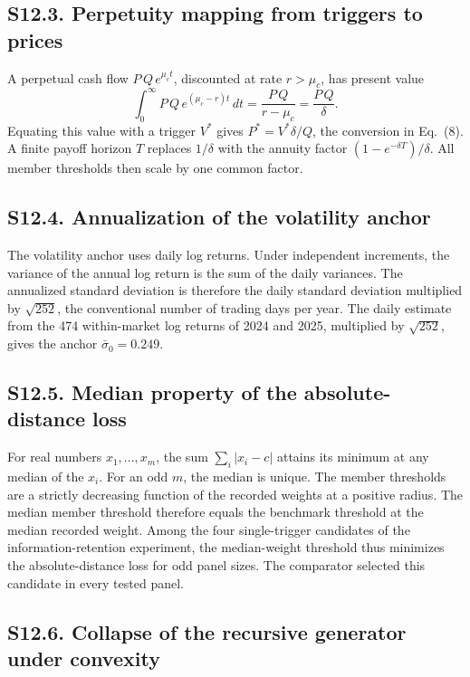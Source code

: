 \documentclass[11pt]{article}
\newcommand{\sbar}{\bar{\sigma}_0}
\begin{document}
\subsection*{S12.3. Perpetuity mapping from triggers to prices}

A perpetual cash flow $P\,Q\,e^{\mu_c t}$, discounted at rate $r>\mu_c$, has present value
\begin{equation*}
\int_{0}^{\infty}P\,Q\,e^{(\mu_c-r)t}\,dt=\frac{P\,Q}{r-\mu_c}=\frac{P\,Q}{\delta}.
\end{equation*}
Equating this value with a trigger $V^{*}$ gives $P^{*}=V^{*}\delta/Q$, the conversion in Eq.~(8). A finite payoff horizon $T$ replaces $1/\delta$ with the annuity factor $(1-e^{-\delta T})/\delta$. All member thresholds then scale by one common factor.

\subsection*{S12.4. Annualization of the volatility anchor}

The volatility anchor uses daily log returns. Under independent increments, the variance of the annual log return is the sum of the daily variances. The annualized standard deviation is therefore the daily standard deviation multiplied by $\sqrt{252}$, the conventional number of trading days per year. The daily estimate from the 474 within-market log returns of 2024 and 2025, multiplied by $\sqrt{252}$, gives the anchor $\sbar=0.249$.

\subsection*{S12.5. Median property of the absolute-distance loss}

For real numbers $x_1,\dots,x_m$, the sum $\sum_{i}\lvert x_i-c\rvert$ attains its minimum at any median of the $x_i$. For an odd $m$, the median is unique. The member thresholds are a strictly decreasing function of the recorded weights at a positive radius. The median member threshold therefore equals the benchmark threshold at the median recorded weight. Among the four single-trigger candidates of the information-retention experiment, the median-weight threshold thus minimizes the absolute-distance loss for odd panel sizes. The comparator selected this candidate in every tested panel.

\subsection*{S12.6. Collapse of the recursive generator under convexity}
\end{document}
